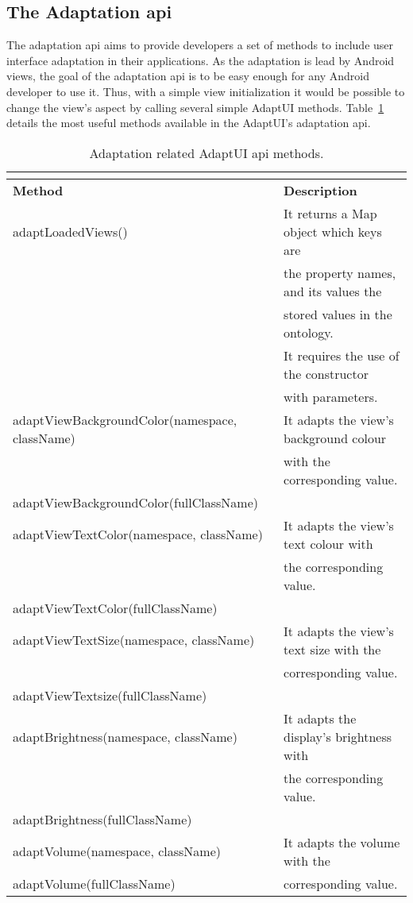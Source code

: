 \subsection{The Adaptation \ac{api}}
\label{sec:adaptation_api}

The adaptation \ac{api} aims to provide developers a set of methods to include
user interface adaptation in their applications. As the adaptation is lead by
Android views, the goal of the adaptation \ac{api} is to be easy enough for
any Android developer to use it. Thus, with a simple view initialization
it would be possible to change the view's aspect by calling several simple 
AdaptUI methods. Table~\ref{tbl:api_adaptation} details the most useful methods 
available in the AdaptUI's adaptation \ac{api}.

\begin{center}
\footnotesize
\begin{longtable}{l l}
  \caption{Adaptation related AdaptUI \ac{api} methods.}\\
  \label{tbl:api_adaptation} \\
  \hline 
  \textbf{Method}				& \textbf{Description}			\\
  \hline
  adaptLoadedViews()				& It returns a Map object which keys are\\
						& the property names, and its values the\\
						& stored values in the ontology.	\\
						& It requires the use of the constructor\\
						& with parameters.			\\
  adaptViewBackgroundColor(namespace, className)& It adapts the view's background colour\\
						& with the corresponding value.		\\
  adaptViewBackgroundColor(fullClassName)	& 					\\
  adaptViewTextColor(namespace, className)	& It adapts the view's text colour with \\
						& the corresponding value.		\\
  adaptViewTextColor(fullClassName)		&					\\
  adaptViewTextSize(namespace, className)	& It adapts the view's text size with the\\
						& corresponding value.			\\
  adaptViewTextsize(fullClassName)		&					\\
  adaptBrightness(namespace, className)		& It adapts the display's brightness with\\
						& the corresponding value.		\\
  adaptBrightness(fullClassName)		& 					\\
  adaptVolume(namespace, className)		& It adapts the volume with the 	\\
  adaptVolume(fullClassName)			& corresponding value.			\\
  \hline
\end{longtable}
\end{center}

